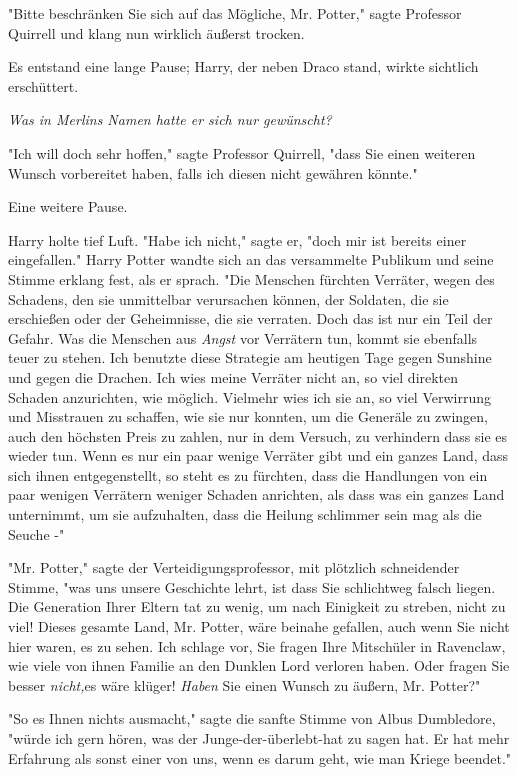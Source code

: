 {"Bitte beschränken Sie sich auf das Mögliche, Mr. Potter," sagte Professor Quirrell und klang nun wirklich äußerst trocken.

Es entstand eine lange Pause; Harry, der neben Draco stand, wirkte sichtlich erschüttert.

\emph{Was in Merlins Namen hatte er sich nur gewünscht?}

"Ich will doch sehr hoffen," sagte Professor Quirrell, "dass Sie einen weiteren Wunsch vorbereitet haben, falls ich diesen nicht gewähren könnte."

Eine weitere Pause.

Harry holte tief Luft. "Habe ich nicht," sagte er, "doch mir ist bereits einer eingefallen." Harry Potter wandte sich an das versammelte Publikum und seine Stimme erklang fest, als er sprach. "Die Menschen fürchten Verräter, wegen des Schadens, den sie unmittelbar verursachen können, der Soldaten, die sie erschießen oder der Geheimnisse, die sie verraten. Doch das ist nur ein Teil der Gefahr. Was die Menschen aus \emph{Angst} vor Verrätern tun, kommt sie ebenfalls teuer zu stehen. Ich benutzte diese Strategie am heutigen Tage gegen Sunshine und gegen die Drachen. Ich wies meine Verräter nicht an, so viel direkten Schaden anzurichten, wie möglich. Vielmehr wies ich sie an, so viel Verwirrung und Misstrauen zu schaffen, wie sie nur konnten, um die Generäle zu zwingen, auch den höchsten Preis zu zahlen, nur in dem Versuch, zu verhindern dass sie es wieder tun. Wenn es nur ein paar wenige Verräter gibt und ein ganzes Land, dass sich ihnen entgegenstellt, so steht es zu fürchten, dass die Handlungen von ein paar wenigen Verrätern weniger Schaden anrichten, als dass was ein ganzes Land unternimmt, um sie aufzuhalten, dass die Heilung schlimmer sein mag als die Seuche -"

"Mr. Potter," sagte der Verteidigungsprofessor, mit plötzlich schneidender Stimme, "was uns unsere Geschichte lehrt, ist dass Sie schlichtweg falsch liegen. Die Generation Ihrer Eltern tat zu wenig, um nach Einigkeit zu streben, nicht zu viel! Dieses gesamte Land, Mr. Potter, wäre beinahe gefallen, auch wenn Sie nicht hier waren, es zu sehen. Ich schlage vor, Sie fragen Ihre Mitschüler in Ravenclaw, wie viele von ihnen Familie an den Dunklen Lord verloren haben. Oder fragen Sie besser \emph{nicht,}es wäre klüger! \emph{Haben} Sie einen Wunsch zu äußern, Mr. Potter?"

"So es Ihnen nichts ausmacht," sagte die sanfte Stimme von Albus Dumbledore, "würde ich gern hören, was der Junge-der-überlebt-hat zu sagen hat. Er hat mehr Erfahrung als sonst einer von uns, wenn es darum geht, wie man Kriege beendet."

}

